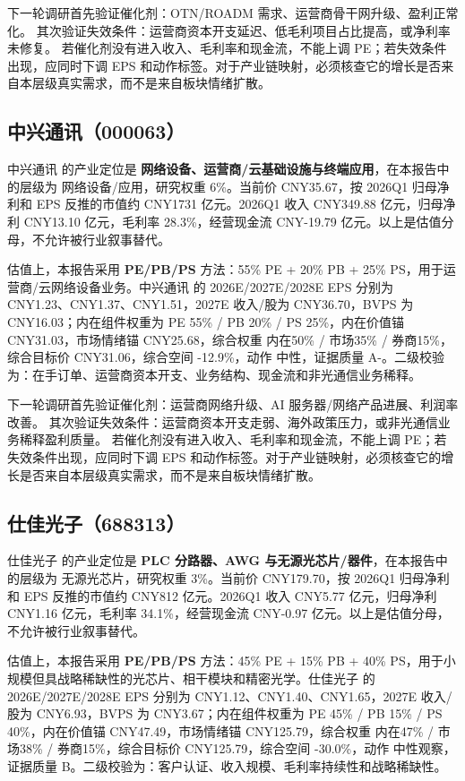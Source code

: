 下一轮调研首先验证催化剂：OTN/ROADM 需求、运营商骨干网升级、盈利正常化。 其次验证失效条件：运营商资本开支延迟、低毛利项目占比提高，或净利率未修复。 若催化剂没有进入收入、毛利率和现金流，不能上调 PE；若失效条件出现，应同时下调 EPS 和动作标签。对于产业链映射，必须核查它的增长是否来自本层级真实需求，而不是来自板块情绪扩散。


\subsection{中兴通讯（000063）}
中兴通讯 的产业定位是 \textbf{网络设备、运营商/云基础设施与终端应用}，在本报告中的层级为 网络设备/应用，研究权重 6\%。当前价 CNY35.67，按 2026Q1 归母净利和 EPS 反推的市值约 CNY1731 亿元。2026Q1 收入 CNY349.88 亿元，归母净利 CNY13.10 亿元，毛利率 28.3\%，经营现金流 CNY-19.79 亿元。以上是估值分母，不允许被行业叙事替代。

估值上，本报告采用 \textbf{PE/PB/PS} 方法：55\% PE + 20\% PB + 25\% PS，用于运营商/云网络设备业务。中兴通讯 的 2026E/2027E/2028E EPS 分别为 CNY1.23、CNY1.37、CNY1.51，2027E 收入/股为 CNY36.70，BVPS 为 CNY16.03；内在组件权重为 PE 55\% / PB 20\% / PS 25\%，内在价值锚 CNY31.03，市场情绪锚 CNY25.68，综合权重 内在50\% / 市场35\% / 券商15\%，综合目标价 CNY31.06，综合空间 -12.9\%，动作 中性，证据质量 A-。二级校验为：在手订单、运营商资本开支、业务结构、现金流和非光通信业务稀释。

下一轮调研首先验证催化剂：运营商网络升级、AI 服务器/网络产品进展、利润率改善。 其次验证失效条件：运营商资本开支走弱、海外政策压力，或非光通信业务稀释盈利质量。 若催化剂没有进入收入、毛利率和现金流，不能上调 PE；若失效条件出现，应同时下调 EPS 和动作标签。对于产业链映射，必须核查它的增长是否来自本层级真实需求，而不是来自板块情绪扩散。


\subsection{仕佳光子（688313）}
仕佳光子 的产业定位是 \textbf{PLC 分路器、AWG 与无源光芯片/器件}，在本报告中的层级为 无源光芯片，研究权重 3\%。当前价 CNY179.70，按 2026Q1 归母净利和 EPS 反推的市值约 CNY812 亿元。2026Q1 收入 CNY5.77 亿元，归母净利 CNY1.16 亿元，毛利率 34.1\%，经营现金流 CNY-0.97 亿元。以上是估值分母，不允许被行业叙事替代。

估值上，本报告采用 \textbf{PE/PB/PS} 方法：45\% PE + 15\% PB + 40\% PS，用于小规模但具战略稀缺性的光芯片、相干模块和精密光学。仕佳光子 的 2026E/2027E/2028E EPS 分别为 CNY1.12、CNY1.40、CNY1.65，2027E 收入/股为 CNY6.93，BVPS 为 CNY3.67；内在组件权重为 PE 45\% / PB 15\% / PS 40\%，内在价值锚 CNY47.49，市场情绪锚 CNY125.79，综合权重 内在47\% / 市场38\% / 券商15\%，综合目标价 CNY125.79，综合空间 -30.0\%，动作 中性观察，证据质量 B。二级校验为：客户认证、收入规模、毛利率持续性和战略稀缺性。

